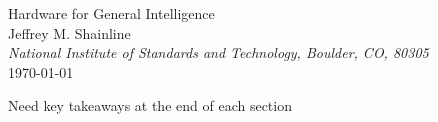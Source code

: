 \documentclass[]{article}
\begin{document}
    
\begin{center}
\LARGE{Hardware for General Intelligence}\\ 
\vspace{0.3em}
\large Jeffrey M. Shainline\\
\vspace{0.0em}
\textit{\small National Institute of Standards and Technology, Boulder, CO, 80305}\\
\vspace{0.3em}
\small \today

\begin{abstract}

\vspace{1em}
\end{abstract}

\end{center}

\begin{multicols}{2}

\setcounter{tocdepth}{4}
\setcounter{secnumdepth}{4}
\tableofcontents

\vspace{3em}
Need key takeaways at the end of each section
\vspace{3em}




















\end{multicols}
\end{document}
